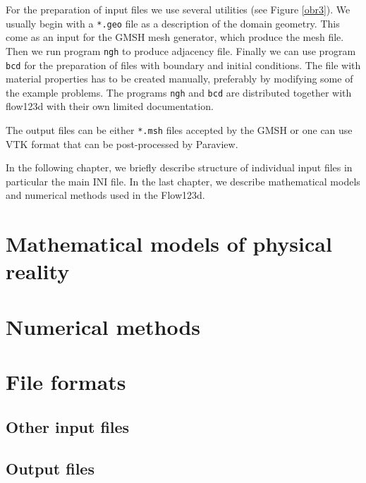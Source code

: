 \documentclass[12pt,a4paper]{report}
\begin{document}
For the preparation of input files we use several utilities (see Figure \ref{obr3}). 
We usually begin with a \verb'*.geo' file as a description of the domain geometry. This come as an input for the GMSH mesh generator, which produce 
the mesh file. Then we run program \verb'ngh' to produce adjacency file. Finally we can use program \verb'bcd' for the preparation of files with
boundary and initial conditions. The file with material properties has to be created manually, preferably by modifying some of the example problems.
The programs \verb'ngh' and \verb'bcd' are distributed together with flow123d with their own limited documentation.

The output files can be either \verb'*.msh' files accepted by the GMSH or one can use VTK format that can be post-processed by Paraview.

In the following chapter, we briefly describe structure of individual input files in particular the main INI file. In the last chapter, we describe
mathematical models and numerical methods used in the Flow123d.


\chapter{Mathematical models of physical reality}

\chapter{Numerical methods}






\chapter{File formats}


\section{Other input files}



\section{Output files}

% 
%   
\end{document}
